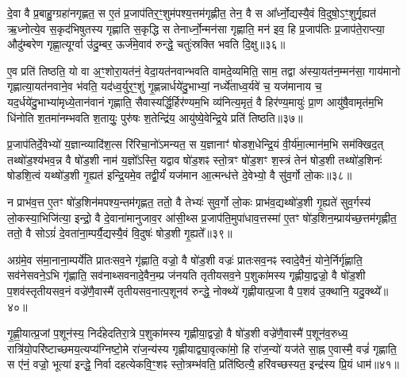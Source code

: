 {\anuvakamend[{द॒भ्नो॒त्यन॑भिषुतस्य गृह्णा॒त्येका॒न्नविꣳ॑श॒तिश्च॑॥९॥}]}

दे॒वा वै प्र॒बाहु॒ग्ग्रहा॑नगृह्णत॒ स ए॒तं प्र॒जाप॑तिर॒ꣳ॒शुम॑पश्य॒त्तम॑गृह्णीत॒ तेन॒ वै स आ᳚र्ध्नो॒द्यस्यै॒वं वि॒दुषो॒\-ऽꣳ॒शुर्गृ॒ह्यत॑ ऋ॒ध्नोत्ये॒व स॒कृद॑भिषुतस्य गृह्णाति स॒कृद्धि स तेनार्ध्नो॒न्मन॑सा गृह्णाति॒ मन॑ इव॒ हि प्र॒जाप॑तिः प्र॒जाप॑ते॒राप्त्या॒ औदु॑म्बरेण गृह्णा॒त्यूर्ग्वा उ॑दु॒म्बर॒ ऊर्ज॑मे॒वाव॑ रुन्द्धे॒ चतुः॑स्रक्ति भवति दि॒क्षु॥३६॥

ए॒व प्रति॑ तिष्ठति॒ यो वा अ॒ꣳ॒शोरा॒यत॑नं॒ वेदा॒यत॑नवान्भवति वामदे॒व्यमिति॒ साम॒ तद्वा अ॑स्या॒यत॑न॒म्मन॑सा॒ गाय॑मानो गृह्णात्या॒यत॑नवाने॒व भ॑वति॒ यद॑ध्व॒र्युर॒ꣳ॒शुं गृ॒ह्णन्नार्धये॑दु॒भाभ्यां॒ नर्ध्ये॑ताध्व॒र्यवे॑ च॒ यज॑मानाय च॒ यद॒र्धये॑दु॒भाभ्या॑मृध्ये॒तान॑वानं गृह्णाति॒ सैवास्यर्द्धि॒र्\mbox{}हिर॑ण्यम॒भि व्य॑नित्य॒मृतं॒ वै हिर॑ण्य॒मायुः॑ प्रा॒ण आयु॑षै॒वामृत॑म॒भि धि॑नोति श॒तमा॑नम्भवति श॒तायुः॒ पुरु॑षः श॒तेन्द्रि॑य॒ आयु॑ष्ये॒वेन्द्रि॒ये प्रति॑ तिष्ठति॥३७॥

{\anuvakamend[{दि॒क्ष्व॑निति विꣳश॒तिश्च॑॥10॥}]}

प्र॒जाप॑तिर्दे॒वेभ्यो॑ य॒ज्ञान्व्यादि॑श॒त्स रि॑रिचा॒नो॑\-ऽमन्यत॒ स य॒ज्ञानाꣳ॑ षोडश॒धेन्द्रि॒यं वी॒र्य॑मा॒त्मान॑म॒भि सम॑क्खिद॒त् तथ्षो॑ड॒श्य॑भव॒न्न वै षो॑ड॒शी नाम॑ य॒ज्ञो᳚\-ऽस्ति॒ यद्वाव षो॑ड॒शꣴ स्तो॒त्रꣳ षो॑ड॒शꣳ श॒स्त्रं तेन॑ षोड॒शी तथ्षो॑ड॒शिनः॑ षोडशि॒त्वं यथ्षो॑ड॒शी गृ॒ह्यत॑ इन्द्रि॒यमे॒व तद्वी॒र्यं॑ यज॑मान आ॒त्मन्ध॑त्ते दे॒वेभ्यो॒ वै सु॑व॒र्गो लो॒कः॥३८॥

न प्राभ॑व॒त्त ए॒तꣳ षो॑ड॒शिन॑मपश्य॒न्तम॑गृह्णत॒ ततो॒ वै तेभ्यः॑ सुव॒र्गो लो॒कः प्राभ॑व॒द्यथ्षो॑ड॒शी गृ॒ह्यते॑ सुव॒र्गस्य॑ लो॒कस्या॒भिजि॑त्या॒ इन्द्रो॒ वै दे॒वाना॑मानुजाव॒र आ॑सी॒थ्स प्र॒जाप॑ति॒मुपा॑धाव॒त्तस्मा॑ ए॒तꣳ षो॑ड॒शिन॒म्प्राय॑च्छ॒त्तम॑गृह्णीत॒ ततो॒ वै सो\-ऽग्रं॑ दे॒वता॑ना॒म्पर्यै॒द्यस्यै॒वं वि॒दुषः॑ षोड॒शी गृ॒ह्यते᳚॥३९॥

अग्र॑मे॒व स॑मा॒नाना॒म्पर्ये॑ति प्रातःसव॒ने गृ॑ह्णाति॒ वज्रो॒ वै षो॑ड॒शी वज्रः॑ प्रातःसव॒नꣴ स्वादे॒वैनं॒ योने॒र्निर्गृ॑ह्णाति॒ सव॑नेसवने॒\-ऽभि गृ॑ह्णाति॒ सव॑नाथ्सवनादे॒वैन॒म्प्र ज॑नयति तृतीयसव॒ने प॒शुका॑मस्य गृह्णीया॒द्वज्रो॒ वै षो॑ड॒शी प॒शव॑स्तृतीयसव॒नं वज्रे॑णै॒वास्मै॑ तृतीयसव॒नात्प॒शूनव॑ रुन्द्धे॒ नोक्थ्ये॑ गृह्णीयात्प्र॒जा वै प॒शव॑ उ॒क्थानि॒ यदु॒क्थ्ये᳚॥४०॥

गृ॒ह्णी॒यात्प्र॒जां प॒शून॑स्य॒ निर्द॑हेदतिरा॒त्रे प॒शुका॑मस्य गृह्णीया॒द्वज्रो॒ वै षो॑ड॒शी वज्रे॑णै॒वास्मै॑ प॒शून॑व॒रुध्य॒ रात्रि॑यो॒परि॑ष्टाच्छमय॒त्यप्य॑ग्निष्टो॒मे रा॑ज॒न्य॑स्य गृह्णीयाद्व्या॒वृत्का॑मो॒ हि रा॑ज॒न्यो॑ यज॑ते सा॒ह्न ए॒वास्मै॒ वज्रं॑ गृह्णाति॒ स ए॑नं॒ वज्रो॒ भूत्या॑ इन्द्धे॒ निर्वा दहत्येकवि॒ꣳ॒शꣴ स्तो॒त्रम्भ॑वति॒ प्रति॑ष्ठित्यै॒ हरि॑वच्छस्यत॒ इन्द्र॑स्य प्रि॒यं धाम॑॥४१॥

